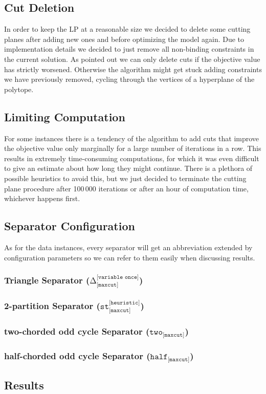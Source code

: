 \subsection{Cut Deletion}\label{subsec:cut_deletion}
In order to keep the LP at a reasonable size we decided to delete some cutting planes after adding new ones and before optimizing the model again.
Due to implementation details we decided to just remove all non-binding constraints in the current solution.
As \cite{sorensenSeparationHeuristic2Partition2020} pointed out we can only delete cuts if the objective value has strictly worsened.
Otherwise the algorithm might get stuck adding constraints we have previously removed, cycling through the vertices of a hyperplane of the polytope.

\subsection{Limiting Computation}\label{subsec:limiting_computation}
For some instances there is a tendency of the algorithm to add cuts that improve the objective value only marginally for a large number of iterations in a row.
This results in extremely time-consuming computations, for which it was even difficult to give an estimate about how long they might continue.
There is a plethora of possible heuristics to avoid this, but we just decided to terminate the cutting plane procedure after 100\,000 iterations or after an hour of computation time, whichever happens first.

\subsection{Separator Configuration}\label{subsec:run_configs}
As for the data instances, every separator will get an abbreviation extended by configuration parameters so we can refer to them easily when discussing results.

\subsubsection{Triangle Separator (\texorpdfstring{$\texttt{Δ}_{\texttt{[maxcut]}}^{\texttt{[variable once]}}$}{Δ})}
\subsubsection{2-partition Separator (\texorpdfstring{$\texttt{st}_{\texttt{[maxcut]}}^{\texttt{[heuristic]}}$}{Δ})}
\subsubsection{two-chorded odd cycle Separator (\texorpdfstring{$\texttt{two}_{\texttt{[maxcut]}}$}{Δ})}
\subsubsection{half-chorded odd cycle Separator (\texorpdfstring{$\texttt{half}_{\texttt{[maxcut]}}$}{Δ})}

\subsection{Results}\label{subsec:experiments_results}
